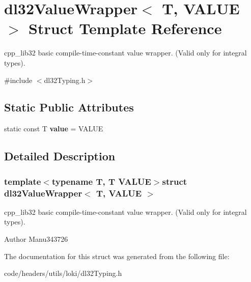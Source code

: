 \hypertarget{structdl32_value_wrapper}{\section{dl32\-Value\-Wrapper$<$ T, V\-A\-L\-U\-E $>$ Struct Template Reference}
\label{structdl32_value_wrapper}
}


cpp\-\_\-lib32 basic compile-\/time-\/constant value wrapper. (Valid only for integral types).  




{\ttfamily \#include $<$dl32\-Typing.\-h$>$}

\subsection*{Static Public Attributes}
\begin{DoxyCompactItemize}
\item 
\hypertarget{structdl32_value_wrapper_aa0eb184c0484db9522b90b94d3186a62}{static const T {\bfseries value} = V\-A\-L\-U\-E}\label{structdl32_value_wrapper_aa0eb184c0484db9522b90b94d3186a62}

\end{DoxyCompactItemize}


\subsection{Detailed Description}
\subsubsection*{template$<$typename T, T V\-A\-L\-U\-E$>$struct dl32\-Value\-Wrapper$<$ T, V\-A\-L\-U\-E $>$}

cpp\-\_\-lib32 basic compile-\/time-\/constant value wrapper. (Valid only for integral types). 

\begin{DoxyAuthor}{Author}
Manu343726 
\end{DoxyAuthor}


The documentation for this struct was generated from the following file\-:\begin{DoxyCompactItemize}
\item 
code/headers/utils/loki/dl32\-Typing.\-h\end{DoxyCompactItemize}
